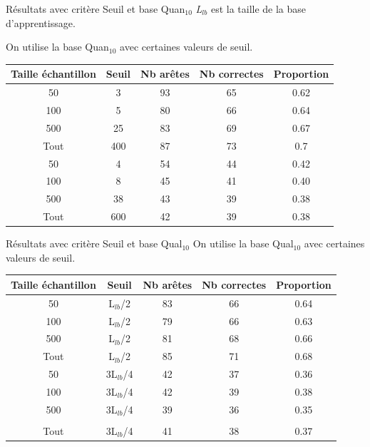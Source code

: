 \documentclass{beamer}
\begin{document}
\begin{frame}{Résultats avec critère Seuil et base Quan$_{10}$}
\emph{L$_{lb}$} est la taille de la base d'apprentissage. 


On utilise la base Quan$_{10}$ avec certaines valeurs de seuil.

\begin{tabular}{|c|c|c|c|c|}
   \hline
   Taille échantillon & Seuil & Nb arêtes & Nb correctes & Proportion\\
   \hline
   50 & 3 & 93 & 65 & 0.62  \\   
   \hline
   100 & 5 & 80 & 66 & 0.64  \\
   \hline
   500 & 25 & 83 & 69 & 0.67  \\
   \hline
   Tout & 400 & 87 & 73 & 0.7 \\
   \hline
   50 & 4 & 54 & 44 & 0.42  \\
   \hline
   100 & 8 & 45 & 41 & 0.40  \\
   \hline
   500 & 38 & 43 & 39 & 0.38  \\
   \hline
   Tout & 600 & 42 & 39 & 0.38 \\
   \hline
\end{tabular}


\end{frame}

\begin{frame}{Résultats avec critère Seuil et base Qual$_{10}$}
On utilise la base Qual$_{10}$ avec certaines valeurs de seuil.
\begin{tabular}{|c|c|c|c|c|}
   \hline
   Taille échantillon & Seuil & Nb arêtes & Nb correctes & Proportion\\
    \hline
   50 & L$_{lb}$/2 & 83 & 66 & 0.64  \\
   \hline
   100 & L$_{lb}$/2 & 79 & 66 & 0.63  \\
   \hline
   500 & L$_{lb}$/2 & 81 & 68 & 0.66  \\
   \hline
   Tout & L$_{lb}$/2 & 85 & 71 & 0.68 \\
   \hline
   50 & 3L$_{lb}$/4 & 42 & 37 & 0.36  \\
   \hline
   100 & 3L$_{lb}$/4 & 42 & 39 & 0.38  \\
   \hline
   500 & 3L$_{lb}$/4 & 39 & 36 & 0.35  \\
   \hline\\
   Tout & 3L$_{lb}$/4 & 41 & 38 & 0.37 \\
   \hline
\end{tabular}
\end{frame}
\end{document}
